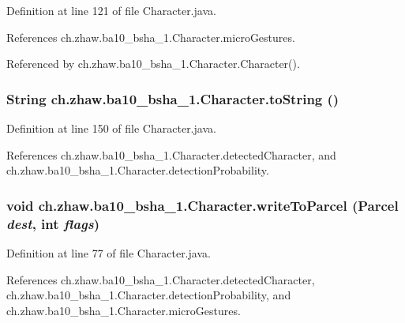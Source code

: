 Definition at line 121 of file Character.java.

References ch.zhaw.ba10\_\-bsha\_\-1.Character.microGestures.

Referenced by ch.zhaw.ba10\_\-bsha\_\-1.Character.Character().\hypertarget{classch_1_1zhaw_1_1ba10__bsha__1_1_1Character_a52e36b4f56fd850f683d0e0e0c3ddf1e}{
\subsubsection[{toString}]{\setlength{\rightskip}{0pt plus 5cm}String ch.zhaw.ba10\_\-bsha\_\-1.Character.toString ()}}
\label{classch_1_1zhaw_1_1ba10__bsha__1_1_1Character_a52e36b4f56fd850f683d0e0e0c3ddf1e}


Definition at line 150 of file Character.java.

References ch.zhaw.ba10\_\-bsha\_\-1.Character.detectedCharacter, and ch.zhaw.ba10\_\-bsha\_\-1.Character.detectionProbability.\hypertarget{classch_1_1zhaw_1_1ba10__bsha__1_1_1Character_ab8b193814ae930d7ee870d11ec3ae788}{
\subsubsection[{writeToParcel}]{\setlength{\rightskip}{0pt plus 5cm}void ch.zhaw.ba10\_\-bsha\_\-1.Character.writeToParcel (Parcel {\em dest}, \/  int {\em flags})}}
\label{classch_1_1zhaw_1_1ba10__bsha__1_1_1Character_ab8b193814ae930d7ee870d11ec3ae788}


Definition at line 77 of file Character.java.

References ch.zhaw.ba10\_\-bsha\_\-1.Character.detectedCharacter, ch.zhaw.ba10\_\-bsha\_\-1.Character.detectionProbability, and ch.zhaw.ba10\_\-bsha\_\-1.Character.microGestures.

